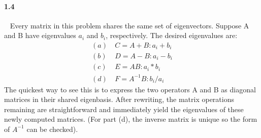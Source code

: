 \documentclass{article}
\begin{document}
\paragraph{1.4}\ \newline
Every matrix in this problem shares the same set of eigenvectors. Suppose A and B have eigenvalues $a_i$ and $b_i$, respectively. The desired eigenvalues are:
\begin{align*}
(a)&\ C = A + B: a_i + b_i \\
(b)&\ D = A - B: a_i - b_i \\
(c)&\ E = AB: a_i*b_i \\
(d)&\ F = A^{-1}B:  b_i/a_i
\end{align*}
The quickest way to see this is to express the two operators A and B as diagonal matrices in their shared eigenbasis. After rewriting, the matrix operations remaining are straightforward and immediately yield the eigenvalues of these newly computed matrices. (For part (d), the inverse matrix is unique so the form of $A^{-1}$ can be checked).
\end{document}
